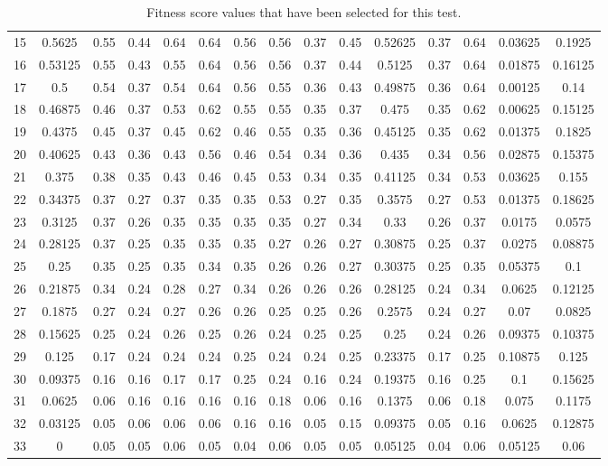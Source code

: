 \begin{table}[H]
{{\begin{tabular}{l||c|c|c|c|c|c|c|c|c||c|c|c||c|c}
 	 15 & 0.5625 & 0.55 & 0.44 & 0.64 & 0.64 & 0.56 & 0.56 & 0.37 & 0.45  &  0.52625 & 0.37 & 0.64  &  0.03625 & 0.1925\\
 	 16 & 0.53125 & 0.55 & 0.43 & 0.55 & 0.64 & 0.56 & 0.56 & 0.37 & 0.44  &  0.5125 & 0.37 & 0.64  &  0.01875 & 0.16125\\
 	 17 & 0.5 & 0.54 & 0.37 & 0.54 & 0.64 & 0.56 & 0.55 & 0.36 & 0.43  &  0.49875 & 0.36 & 0.64  &  0.00125 & 0.14\\
 	 18 & 0.46875 & 0.46 & 0.37 & 0.53 & 0.62 & 0.55 & 0.55 & 0.35 & 0.37  &  0.475 & 0.35 & 0.62  &  0.00625 & 0.15125\\
 	 19 & 0.4375 & 0.45 & 0.37 & 0.45 & 0.62 & 0.46 & 0.55 & 0.35 & 0.36  &  0.45125 & 0.35 & 0.62  &  0.01375 & 0.1825\\
 	 20 & 0.40625 & 0.43 & 0.36 & 0.43 & 0.56 & 0.46 & 0.54 & 0.34 & 0.36  &  0.435 & 0.34 & 0.56  &  0.02875 & 0.15375\\
 	 21 & 0.375 & 0.38 & 0.35 & 0.43 & 0.46 & 0.45 & 0.53 & 0.34 & 0.35  &  0.41125 & 0.34 & 0.53  &  0.03625 & 0.155\\
 	 22 & 0.34375 & 0.37 & 0.27 & 0.37 & 0.35 & 0.35 & 0.53 & 0.27 & 0.35  &  0.3575 & 0.27 & 0.53  &  0.01375 & 0.18625\\
 	 23 & 0.3125 & 0.37 & 0.26 & 0.35 & 0.35 & 0.35 & 0.35 & 0.27 & 0.34  &  0.33 & 0.26 & 0.37  &  0.0175 & 0.0575\\
 	 24 & 0.28125 & 0.37 & 0.25 & 0.35 & 0.35 & 0.35 & 0.27 & 0.26 & 0.27  &  0.30875 & 0.25 & 0.37  &  0.0275 & 0.08875\\
 	 25 & 0.25 & 0.35 & 0.25 & 0.35 & 0.34 & 0.35 & 0.26 & 0.26 & 0.27  &  0.30375 & 0.25 & 0.35  &  0.05375 & 0.1\\
 	 26 & 0.21875 & 0.34 & 0.24 & 0.28 & 0.27 & 0.34 & 0.26 & 0.26 & 0.26  &  0.28125 & 0.24 & 0.34  &  0.0625 & 0.12125\\
 	 27 & 0.1875 & 0.27 & 0.24 & 0.27 & 0.26 & 0.26 & 0.25 & 0.25 & 0.26  &  0.2575 & 0.24 & 0.27  &  0.07 & 0.0825\\
 	 28 & 0.15625 & 0.25 & 0.24 & 0.26 & 0.25 & 0.26 & 0.24 & 0.25 & 0.25  &  0.25 & 0.24 & 0.26  &  0.09375 & 0.10375\\
 	 29 & 0.125 & 0.17 & 0.24 & 0.24 & 0.24 & 0.25 & 0.24 & 0.24 & 0.25  &  0.23375 & 0.17 & 0.25  &  0.10875 & 0.125\\
 	 30 & 0.09375 & 0.16 & 0.16 & 0.17 & 0.17 & 0.25 & 0.24 & 0.16 & 0.24  &  0.19375 & 0.16 & 0.25  &  0.1 & 0.15625\\
 	 31 & 0.0625 & 0.06 & 0.16 & 0.16 & 0.16 & 0.16 & 0.18 & 0.06 & 0.16  &  0.1375 & 0.06 & 0.18  &  0.075 & 0.1175\\
 	 32 & 0.03125 & 0.05 & 0.06 & 0.06 & 0.06 & 0.16 & 0.16 & 0.05 & 0.15  &  0.09375 & 0.05 & 0.16  &  0.0625 & 0.12875\\
 	 33 & 0 & 0.05 & 0.05 & 0.06 & 0.05 & 0.04 & 0.06 & 0.05 & 0.05  &  0.05125 & 0.04 & 0.06  &  0.05125 & 0.06\\
  \end{tabular}
}}
\caption[Fitness Score Distribution (Raw Test Data)]{Fitness score values that have been selected for this test.}
\label{alldatatable}
\end{table}


